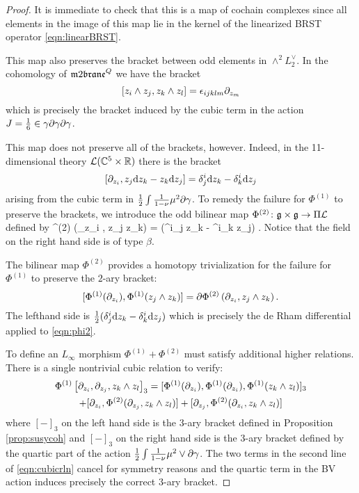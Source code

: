 \begin{proof}
It is immediate to check that this is a map of cochain complexes since all elements in the image of this map lie in the kernel of the linearized BRST operator \eqref{eqn:linearBRST}. 

This map also preserves the bracket between odd elements in $\wedge^2 L_2^\vee$. 
In the cohomology of $\m2^Q$ we have the bracket
\[
[z_i\wedge z_j , z_k \wedge z_l] = \epsilon_{ijklm} \partial_{z_m}
\]
which is precisely the bracket induced by the cubic term in the action $J = \frac16 \in \gamma \partial \gamma \partial \gamma$. 

This map does not preserve all of the brackets, however. 
Indeed, in the 11-dimensional theory $\mathcal L(\mathbb C^5 \times \mathbb R)$ there is the bracket 
\[
\left[\partial_{z_i}, z_j {\rm d} z_k - z_k {\rm d} z_j\right] = \delta^i_j {\rm d} z_k - \delta^i_k {\rm d} z_j 
\]
arising from the cubic term in $\frac12 \int \frac{1}{1-\nu} \mu^2 \partial \gamma$. 
To remedy the failure for $\Phi^{(1)}$ to preserve the brackets, we introduce the odd bilinear map $\Phi^{(2)} \colon \mathfrak g \times \mathfrak g \to \Pi \mathcal L$ defined by 
\beqn\label{eqn:phi2}
\Phi^{(2)} \left(\partial_{z_i} , z_j \wedge z_k\right) =  (\delta^i_j z_k - \delta^i_k z_j) .
\eeqn
Notice that the field on the right hand side is of type $\beta$. 

The bilinear map $\Phi^{(2)}$ provides a homotopy trivialization for the failure for $\Phi^{(1)}$ to preserve the $2$-ary bracket: 
\[
[\Phi^{(1)} (\partial_{z_i}) , \Phi^{(1)}(z_j \wedge z_k)] = \partial \Phi^{(2)}\left(\partial_{z_i} , z_j \wedge z_k\right).
\]
The lefthand side is $\frac12 (\delta_j^i {\rm d} z_k - \delta_k^i {\rm d} z_j)$ which is precisely the de Rham differential applied to \eqref{eqn:phi2}.

To define an $L_\infty$ morphism $\Phi^{(1)} + \Phi^{(2)}$ must satisfy additional higher relations. 
There is a single nontrivial cubic relation to verify:
\begin{multline} \label{eqn:cubicrln}
\Phi^{(1)}\left[\partial_{z_i}, \partial_{z_j}, z_k \wedge z_l\right]_3 = [\Phi^{(1)}(\partial_{z_i}), \Phi^{(1)}(\partial_{z_i}), \Phi^{(1)}(z_k \wedge z_l)]_3 \\ + [\partial_{z_i}, \Phi^{(2)}(\partial_{z_j}, z_k \wedge z_l)] + [\partial_{z_j}, \Phi^{(2)}(\partial_{z_i}, z_k \wedge z_l)]
\end{multline}
where $[-]_3$ on the left hand side is the $3$-ary bracket defined in Proposition \ref{prop:susycoh} and $[-]_3$ on the right hand side is the $3$-ary bracket defined by the quartic part of the action $\frac12 \int \frac{1}{1-\nu} \mu^2 \vee \partial \gamma$. 
The two terms in the second line of \eqref{eqn:cubicrln} cancel for symmetry reasons and the quartic term in the BV action induces precisely the correct $3$-ary bracket. 

\end{proof}


